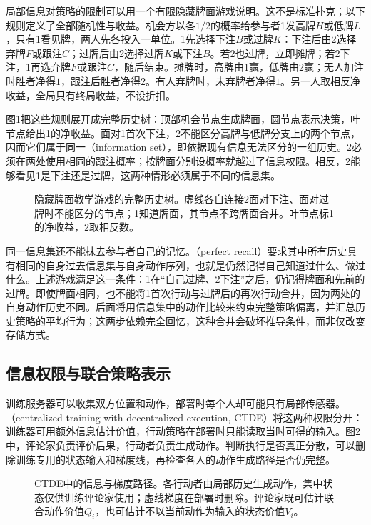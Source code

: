 局部信息对策略的限制可以用一个有限隐藏牌面游戏说明。这不是标准扑克；以下规则定义了全部随机性与收益。机会方以各$1/2$的概率给参与者1发高牌$H$或低牌$L$，只有1看见牌，两人先各投入一单位。1先选择下注$B$或过牌$K$：下注后由2选择弃牌$F$或跟注$C$；过牌后由2选择过牌$K$或下注$B$。若2也过牌，立即摊牌；若2下注，1再选弃牌$F$或跟注$C$，随后结束。摊牌时，高牌由1赢，低牌由2赢；无人加注时胜者净得$1$，跟注后胜者净得$2$。有人弃牌时，未弃牌者净得$1$。另一人取相反净收益，全局只有终局收益，不设折扣。

图\ref{fig:rl-multi-agent-card-tree}把这些规则展开成完整历史树：顶部机会节点生成牌面，圆节点表示决策，叶节点给出1的净收益。面对1首次下注，2不能区分高牌与低牌分支上的两个节点，因而它们属于同一（information set），即依据现有信息无法区分的一组历史。2必须在两处使用相同的跟注概率；按牌面分别设概率就越过了信息权限。相反，2能够看见1是下注还是过牌，这两种情形必须属于不同的信息集。

\begin{figure}[htbp]
 \centering
 
 \caption{隐藏牌面教学游戏的完整历史树。虚线各自连接2面对下注、面对过牌时不能区分的节点；1知道牌面，其节点不跨牌面合并。叶节点标1的净收益，2取相反数。}
 \label{fig:rl-multi-agent-card-tree}
\end{figure}

同一信息集还不能抹去参与者自己的记忆。（perfect recall）要求其中所有历史具有相同的自身过去信息集与自身动作序列，也就是仍然记得自己知道过什么、做过什么。上述游戏满足这一条件：1在“自己过牌、2下注”之后，仍记得牌面和先前的过牌。即使牌面相同，也不能将1首次行动与过牌后的再次行动合并，因为两处的自身动作历史不同。后面将用信息集中的动作比较来约束完整策略偏离，并汇总历史策略的平均行为；这两步依赖完全回忆，这种合并会破坏推导条件，而非仅改变存储方式。

\subsection{信息权限与联合策略表示}
\label{sec:rl-multi-agent-permissions}

训练服务器可以收集双方位置和动作，部署时每个人却可能只有局部传感器。（centralized training with decentralized execution, CTDE）将这两种权限分开：训练器可用额外信息估计价值，行动策略在部署时只能读取当时可得的输入。图\ref{fig:rl-multi-agent-ctde}中，评论家负责评价后果，行动者负责生成动作。判断执行是否真正分散，可以删除训练专用的状态输入和梯度线，再检查各人的动作生成路径是否仍完整。

\begin{figure}[htbp]
 \centering
 
 \caption{CTDE中的信息与梯度路径。各行动者由局部历史生成动作，集中状态仅供训练评论家使用；虚线梯度在部署时删除。评论家既可估计联合动作价值$Q_i$，也可估计不以当前动作为输入的状态价值$V_i$。}
 \label{fig:rl-multi-agent-ctde}
\end{figure}

